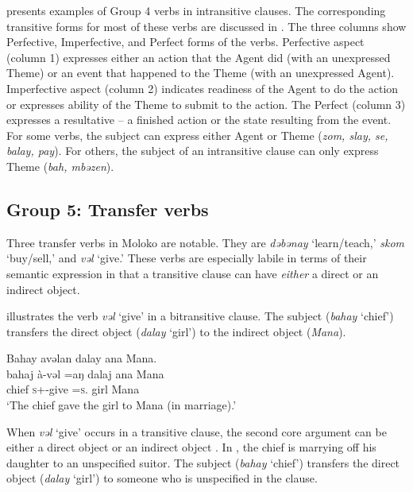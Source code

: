 \largerpage
{} presents examples of Group 4 verbs in intransitive clauses. The corresponding transitive forms for most of these verbs are discussed in . The three columns show Perfective, Imperfective, and Perfect forms of the verbs. Perfective aspect (column 1) expresses either an action that the Agent did (with an unexpressed Theme) or an event that happened to the Theme (with an unexpressed Agent). Imperfective aspect (column 2) indicates readiness of the Agent to do the action or expresses ability of the Theme to submit to the action. The Perfect (column 3) expresses a resultative -- a finished action or the state resulting from the event. For some verbs, the subject can express either Agent or Theme (\textit{zom, slay, se, balay, pay}). For others, the subject of an intransitive clause can only express Theme (\textit{bah, mbəzen}).


\subsection{Group 5: Transfer verbs}\label{sec:9.2.5}
\hypertarget{RefHeading1212741525720847}{}
Three transfer verbs in Moloko are notable. They are \textit{dəbənay} ‘learn/teach,’ \textit{skom} ‘buy/sell,’ and \textit{vəl}  ‘give.’ These verbs are especially labile in terms of their semantic expression in that a transitive clause can have \textit{either} a direct or an indirect object. 

 illustrates the verb \textit{vəl}  ‘give’ in a bitransitive clause. The subject (\textit{bahay} ‘chief’) transfers the direct object (\textit{dalay}  ‘girl’) to the indirect object (\textit{Mana}).

\ea \label{ex:9:33}
Bahay  avəlan  dalay  ana  Mana.\\
\gll  bahaj   à-vəl    =aŋ     dalaj   ana   Mana\\
      chief  \textsc{s}+{\PFV}-give  =\textsc{s}.{\IO}  girl  {\DAT} Mana\\
\glt  ‘The chief gave the girl to Mana (in marriage).’ 
\z

When \textit{vəl}  ‘give’ occurs in a transitive clause, the second core argument can be either a direct object  or an indirect object .  In , the chief is marrying off his daughter to an unspecified suitor. The subject (\textit{bahay}  ‘chief’) transfers the direct object (\textit{dalay}  ‘girl’) to someone who is unspecified in the clause. 

